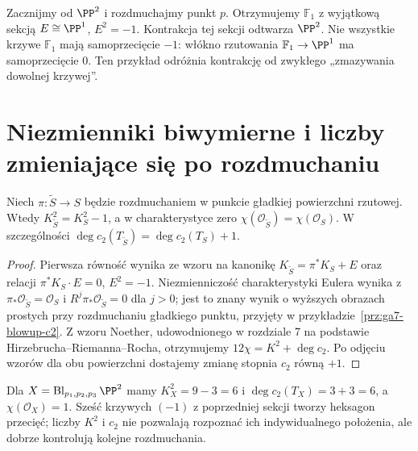\begin{przyklad}
Zacznijmy od $\PP^2$ i rozdmuchajmy punkt $p$.
Otrzymujemy $\mathbb F_1$ z wyjątkową sekcją
$E\cong\PP^1$, $E^2=-1$. Kontrakcja tej sekcji
odtwarza $\PP^2$. Nie wszystkie krzywe $\mathbb F_1$
mają samoprzecięcie $-1$: włókno rzutowania
$\mathbb F_1\to\PP^1$ ma samoprzecięcie $0$.
Ten przykład odróżnia kontrakcję od zwykłego
„zmazywania dowolnej krzywej”.
\end{przyklad}

\section{Niezmienniki biwymierne i liczby zmieniające się po rozdmuchaniu}
\label{sec:ga8-invariants}

\begin{stwierdzenie}
\label{st:ga8-classes-blowup}
Niech $\pi:\widetilde S\to S$ będzie rozdmuchaniem
w punkcie gładkiej powierzchni rzutowej. Wtedy
$K_{\widetilde S}^2=K_S^2-1$, a w charakterystyce zero
$\chi(\mathcal O_{\widetilde S})=\chi(\mathcal O_S)$.
W szczególności $\deg c_2(T_{\widetilde S})=
\deg c_2(T_S)+1$.
\end{stwierdzenie}
\begin{proof}
Pierwsza równość wynika ze wzoru na kanonikę
$K_{\widetilde S}=\pi^*K_S+E$ oraz relacji
$\pi^*K_S\cdot E=0$, $E^2=-1$.
Niezmienniczość charakterystyki Eulera wynika z
$\pi_*\mathcal O_{\widetilde S}=\mathcal O_S$
i $R^j\pi_*\mathcal O_{\widetilde S}=0$ dla $j>0$;
jest to znany wynik o wyższych obrazach prostych przy
rozdmuchaniu gładkiego punktu, przyjęty w
przykładzie~\ref{prz:ga7-blowup-c2}.
Z wzoru Noether, udowodnionego w rozdziale 7
na podstawie Hirzebrucha--Riemanna--Rocha,
otrzymujemy $12\chi=K^2+\deg c_2$.
Po odjęciu wzorów dla obu powierzchni dostajemy
zmianę stopnia $c_2$ równą $+1$.
\end{proof}

\begin{przyklad}
Dla $X=\operatorname{Bl}_{p_1,p_2,p_3}\PP^2$
mamy $K_X^2=9-3=6$ i $\deg c_2(T_X)=3+3=6$,
a $\chi(\mathcal O_X)=1$. Sześć krzywych $(-1)$
z poprzedniej sekcji tworzy heksagon przecięć;
liczby $K^2$ i $c_2$ nie pozwalają rozpoznać
ich indywidualnego położenia, ale dobrze
kontrolują kolejne rozdmuchania.
\end{przyklad}

